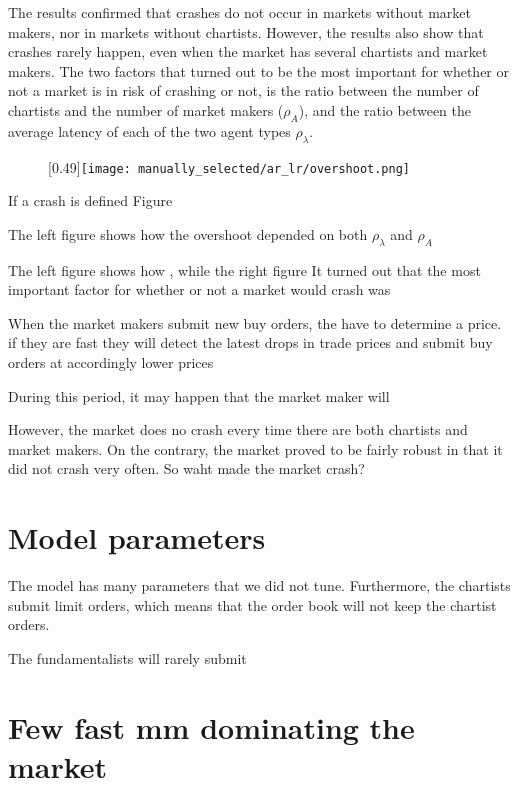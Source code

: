 The results confirmed that crashes do not occur in markets without market makers, nor in markets without chartists. However, the results also show that crashes rarely happen, even when the market has several chartists and market makers. The two factors that turned out to be the most important for whether or not a market is in risk of crashing or not, is the ratio between the number of chartists and the number of market makers ($\rho_A$), and the ratio between the average latency of each of the two agent types $\rho_{\lambda}$.

\begin{figure}
	\centering
	\subcaptionbox{}
	[0.49\linewidth]{\texttt{[image: manually\_selected/ar\_lr/overshoot.png]}}
	\caption{}
	\label{}
\end{figure}


If a crash is defined 
Figure

The left figure shows how the overshoot depended on both $\rho_{\lambda}$ and $\rho_A$

The left figure shows how , while the right figure 
It turned out that the most important factor for whether or not a market would crash was 




When the market makers submit new buy orders, the have to determine a price. if they are fast they will detect the latest drops in trade prices and submit buy orders at accordingly lower prices

During this period, it may happen that the market maker will 

However, the market does no crash every time there are both chartists and market makers. On the contrary, the market proved to be fairly robust in that it did not crash very often. So waht made the market crash?


\section{Model parameters}
The model has many parameters that we did not tune.
Furthermore, the chartists submit limit orders, which means that the order book will not keep the chartist orders. 

The fundamentalists will rarely submit 



\section{Few fast mm dominating the market}
 


